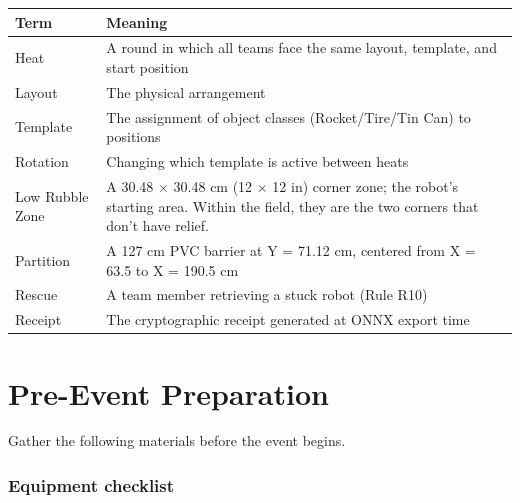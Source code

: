 \documentclass[a4]{article}
\begin{document}
\begin{table}[H]
\centering
\begin{tabular}{lp{14cm}}
\toprule
\textbf{Term} & \textbf{Meaning} \\
\midrule
Heat & A round in which all teams face the same layout, template, and start position \\
Layout & The physical arrangement \\
Template & The assignment of object classes (Rocket/Tire/Tin Can) to positions \\
Rotation & Changing which template is active between heats \\
Low Rubble Zone & A 30.48 $\times$ 30.48 cm (12 $\times$ 12 in) corner zone; the robot's starting area. Within the field, they are the two corners that don't have relief. \\
Partition & A 127 cm PVC barrier at Y = 71.12 cm, centered from X = 63.5 to X = 190.5 cm \\
Rescue & A team member retrieving a stuck robot (Rule R10) \\
Receipt & The cryptographic receipt generated at ONNX export time \\
\bottomrule
\end{tabular}
\end{table}

\pagebreak
\section*{Pre-Event Preparation}

Gather the following materials before the event begins.

\subsubsection*{Equipment checklist}
\end{document}
